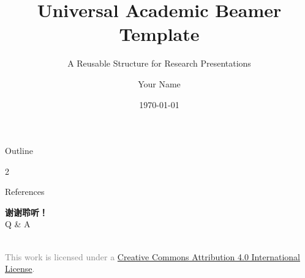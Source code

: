 \documentclass[aspectratio=169]{beamer}
\title{Universal Academic Beamer Template}
\subtitle{A Reusable Structure for Research Presentations}
\author[Your Name]{Your Name}
\institute[Your University]{Your Department, Your University, \texttt{your.email@example.com}}
\date{\today}
\begin{document}
\begin{frame}
  \titlepage
\end{frame}

\begin{frame}{Outline}
  \begin{multicols}{2}
    \tableofcontents
  \end{multicols}
\end{frame}






\appendix




\begin{frame}[allowframebreaks]{References}
  \printbibliography
\end{frame}

\begin{frame}
  \vspace*{\fill}
  \begin{center}
    {\Huge \textbf{谢谢聆听！}} \\[1em]
    {\large Q \& A}
  \end{center}
  \vspace*{\fill}
  
  \begin{center}
    \tiny \textcolor{gray}{
      \ccby \\ %
      This work is licensed under a \href{https://creativecommons.org/licenses/by/4.0/}{Creative Commons Attribution 4.0 International License}.
    }
  \end{center}
\end{frame}
\end{document}
